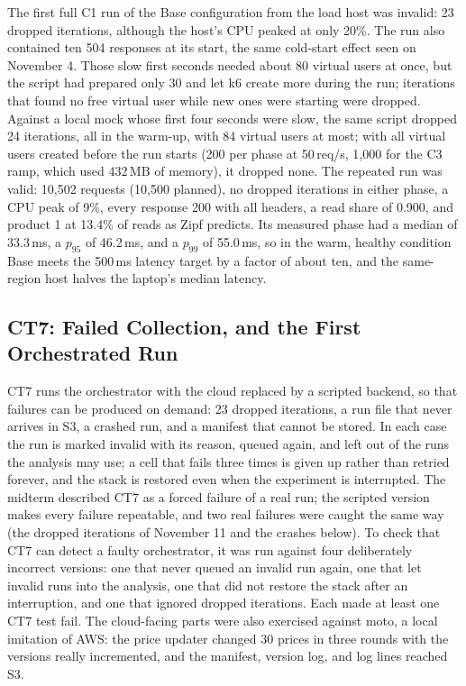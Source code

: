 \documentclass[10pt]{article}
\begin{document}
The first full C1 run of the Base configuration from the load host was
invalid: 23 dropped iterations, although the host's CPU peaked at only 20\%.
The run also contained ten 504 responses at its start, the same cold-start
effect seen on November 4. Those slow first seconds needed about 80 virtual
users at once, but the script had prepared only 30 and let k6 create more
during the run; iterations that found no free virtual user while new ones
were starting were dropped. Against a local mock whose first four seconds
were slow, the same script dropped 24 iterations, all in the warm-up, with 84
virtual users at most; with all virtual users created before the run starts
(200 per phase at 50\,req/s, 1{,}000 for the C3 ramp, which used 432\,MB of
memory), it dropped none. The repeated run was valid: 10{,}502 requests (10{,}500
planned), no dropped iterations in either phase, a CPU peak of 9\%, every
response 200 with all headers, a read share of 0.900, and product 1 at
13.4\% of reads as Zipf predicts. Its measured phase had a median of 33.3\,ms,
a $p_{95}$ of 46.2\,ms, and a $p_{99}$ of 55.0\,ms, so in the warm, healthy
condition Base meets the 500\,ms latency target by a factor of about ten, and
the same-region host halves the laptop's median latency.

\subsection{CT7: Failed Collection, and the First Orchestrated Run}
CT7 runs the orchestrator with the cloud replaced by a scripted backend, so that
failures can be produced on demand: 23 dropped iterations, a run file that
never arrives in S3, a crashed run, and a manifest that cannot be stored. In
each case the run is marked invalid with its reason, queued again, and left
out of the runs the analysis may use; a cell that fails three times is given
up rather than retried forever, and the stack is restored even when the
experiment is interrupted. The midterm described CT7 as a forced failure of a
real run; the scripted version makes every failure repeatable, and two real
failures were caught the same way (the dropped iterations of November 11 and
the crashes below). To check that CT7 can detect a faulty orchestrator, it was
run against four deliberately incorrect versions: one that never queued an
invalid run again, one that let invalid runs into the analysis, one that did
not restore the stack after an interruption, and one that ignored dropped
iterations. Each made at least one CT7 test fail. The cloud-facing parts were
also exercised against moto, a local imitation of AWS: the price updater
changed 30 prices in three rounds with the versions really incremented, and
the manifest, version log, and log lines reached S3.
\end{document}
